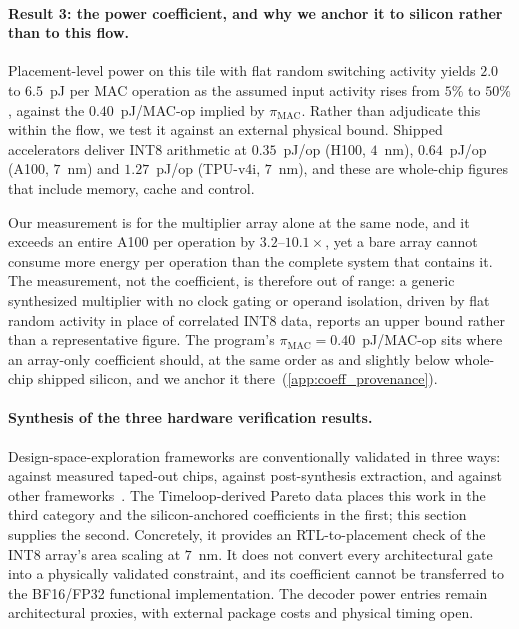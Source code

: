 \paragraph{Result 3: the power coefficient, and why we anchor it to silicon rather than to this flow.}
Placement-level power on this tile with flat random switching activity yields $2.0$ to $6.5$~pJ per MAC operation as the assumed input activity rises from $5\%$ to $50\%$, against the $0.40$~pJ/MAC-op implied by $\pi_{\mathrm{MAC}}$.
Rather than adjudicate this within the flow, we test it against an external physical bound.
Shipped accelerators deliver INT8 arithmetic at $0.35$~pJ/op (H100, $4$~nm), $0.64$~pJ/op (A100, $7$~nm) and $1.27$~pJ/op (TPU-v4i, $7$~nm), and these are whole-chip figures that include memory, cache and control.

Our measurement is for the multiplier array alone at the same node, and it exceeds an entire A100 per operation by $3.2$--$10.1\times$, yet a bare array cannot consume more energy per operation than the complete system that contains it.
The measurement, not the coefficient, is therefore out of range: a generic synthesized multiplier with no clock gating or operand isolation, driven by flat random activity in place of correlated INT8 data, reports an upper bound rather than a representative figure.
The program's $\pi_{\mathrm{MAC}}=0.40$~pJ/MAC-op sits where an array-only coefficient should, at the same order as and slightly below whole-chip shipped silicon, and we anchor it there~(\cref{app:coeff_provenance}).

\paragraph{Synthesis of the three hardware verification results.}
Design-space-exploration frameworks are conventionally validated in three ways: against measured taped-out chips, against post-synthesis extraction, and against other frameworks~\citep{mei2021zigzag}.
The Timeloop-derived Pareto data places this work in the third category and the silicon-anchored coefficients in the first; this section supplies the second.
Concretely, it provides an RTL-to-placement check of the INT8 array's area scaling at $7$~nm.
It does not convert every architectural gate into a physically validated constraint, and its coefficient cannot be transferred to the BF16/FP32 functional implementation.
The decoder power entries remain architectural proxies, with external package costs and physical timing open.

